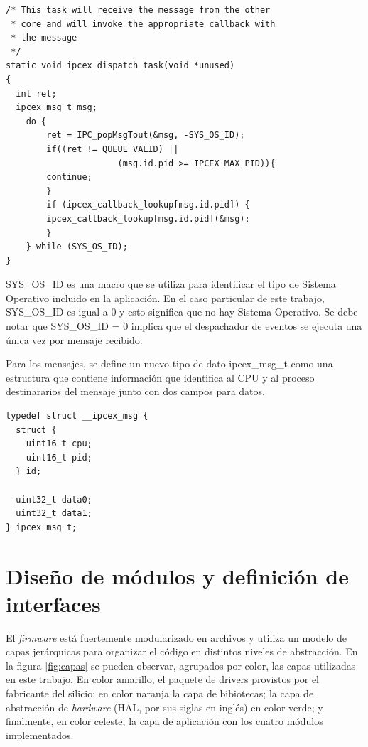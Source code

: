\begin{verbatim}
/* This task will receive the message from the other 
 * core and will invoke the appropriate callback with
 * the message
 */
static void ipcex_dispatch_task(void *unused)
{
  int ret;
  ipcex_msg_t msg;
  	do {
    	ret = IPC_popMsgTout(&msg, -SYS_OS_ID);
    	if((ret != QUEUE_VALID) || 
                      (msg.id.pid >= IPCEX_MAX_PID)){
      	continue;
    	}
    	if (ipcex_callback_lookup[msg.id.pid]) {
      	ipcex_callback_lookup[msg.id.pid](&msg);
    	}
  	} while (SYS_OS_ID);
}
\end{verbatim}

SYS\_OS\_ID es una macro que se utiliza para identificar el tipo de Sistema Operativo incluido en la aplicación.  En el caso particular de este trabajo, SYS\_OS\_ID es igual a 0 y esto significa que no hay Sistema Operativo.  Se debe notar que SYS\_OS\_ID = 0 implica que el despachador de eventos se ejecuta una única vez por mensaje recibido.

Para los mensajes, se define un nuevo tipo de dato ipcex\_msg\_t como una estructura que contiene información que identifica al CPU y al proceso destinararios del mensaje junto con dos campos para datos.

\begin{verbatim}
typedef struct __ipcex_msg {
  struct {
    uint16_t cpu;
    uint16_t pid;
  } id;

  uint32_t data0;
  uint32_t data1;
} ipcex_msg_t;
\end{verbatim}

\section{Diseño de módulos y definición de interfaces}
\label{sec:modulos}

El \textit{firmware} está fuertemente modularizado en archivos y utiliza un modelo de capas jerárquicas para organizar el código en distintos niveles de abstracción.  En la figura \ref{fig:capas} se pueden observar, agrupados por color, las capas utilizadas en este trabajo.  En color amarillo, el paquete de drivers provistos por el fabricante del silicio; en color naranja la capa de bibiotecas; la capa de abstracción de \textit{hardware} (HAL, por sus siglas en inglés) en color verde; y finalmente, en color celeste, la capa de aplicación con los cuatro módulos implementados.   

